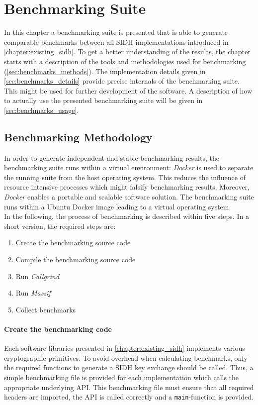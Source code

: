\chapter{Benchmarking Suite}\label{chapter:benchmarking_suite}
In this chapter a benchmarking suite is presented that is able to generate comparable benchmarks between all SIDH implementations introduced in \autoref{chapter:existing_sidh}. To get a better understanding of the results, the chapter starts with a  description of the tools and methodologies used for benchmarking (\autoref{sec:benchmarks_methods}). The implementation details given in \autoref{sec:benchmarks_details} provide precise internals of the benchmarking suite. This might be used for further development of the software. A description of how to actually use the presented benchmarking suite will be given in \autoref{sec:benchmarks_usage}.

\section{Benchmarking Methodology}\label{sec:benchmarks_methods}
In order to generate independent and stable benchmarking results, the benchmarking suite runs within a virtual environment: \textit{Docker} is used to separate the running suite from the host operating system. This reduces the influence of resource intensive processes which might falsify benchmarking results. Moreover, \textit{Docker} enables a portable and scalable software solution. The benchmarking suite runs within a Ubuntu Docker image leading to a virtual operating system.
\\
In the following, the process of benchmarking is described within five steps. In a short version, the required steps are:

\begin{enumerate}
  \itemsep0em 
  \item Create the benchmarking source code
  \item Compile the benchmarking source code
  \item Run \textit{Callgrind}
  \item Run \textit{Massif}
  \item Collect benchmarks
\end{enumerate}

\subsubsection{Create the benchmarking code}
Each software libraries presented in \autoref{chapter:existing_sidh} implements various cryptographic primitives. To avoid overhead when calculating benchmarks, only the required functions to generate a SIDH key exchange should be called. Thus, a simple benchmarking file is provided for each implementation which calls the appropriate underlying API. This benchmarking file must ensure that all required headers are imported, the API is called correctly and a \texttt{main}-function is provided.

